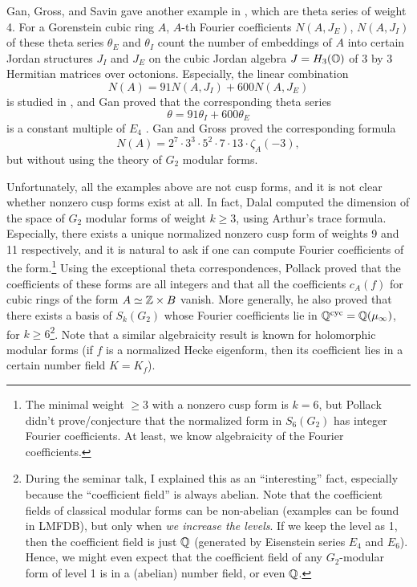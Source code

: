 Gan, Gross, and Savin gave another example in \cite{gan2002fourier}, which are theta series of weight 4.
For a Gorenstein cubic ring $A$, $A$-th Fourier coefficients $N(A, J_E)$, $N(A, J_I)$ of these theta series $\theta_E$ and $\theta_I$ count the number of embeddings  of $A$ into certain Jordan structures $J_I$ and $J_E$ on the cubic Jordan algebra $J = H_3(\mathbb{O})$ of 3 by 3 Hermitian matrices over octonions.
Especially, the linear combination
$$
N(A) = 91 N(A, J_I) + 600 N(A, J_E)
$$
is studied in \cite{gross1999commutative}, and Gan proved that the corresponding theta series
$$
\theta = 91 \theta_I + 600 \theta_E
$$
is a constant multiple of $E_4$ \cite{gan2000siegel}.
Gan and Gross proved the corresponding formula \cite[Theorem 3]{gross1999commutative}
$$
N(A) = 2^7 \cdot 3^3 \cdot 5^2 \cdot 7 \cdot 13 \cdot \zeta_A(-3),
$$
but without using the theory of $G_2$ modular forms.

Unfortunately, all the examples above are not cusp forms, and it is not clear whether nonzero cusp forms exist at all.
In fact, Dalal \cite{dalal2023counting} computed the dimension of the space of $G_2$ modular forms of weight $k \ge 3$, using Arthur's trace formula.
Especially, there exists a unique normalized nonzero cusp form of weights 9 and 11 respectively, and it is natural to ask if one can compute Fourier coefficients of the form.\footnote{The minimal weight $\ge 3$ with a nonzero cusp form is $k = 6$, but Pollack didn't prove/conjecture that the normalized form in $S_6(G_2)$ has integer Fourier coefficients. At least, we know algebraicity of the Fourier coefficients.}
Using the exceptional theta correspondences, Pollack \cite{pollack2022exceptional,pollack2024computation} proved that the coefficients of these forms are all integers and that all the coefficients $c_A(f)$ for cubic rings of the form $A \simeq \mathbb{Z} \times B$ vanish.
More generally, he also proved that there exists a basis of $S_k(G_2)$ whose Fourier coefficients lie in $\mathbb{Q}^{\mathrm{cyc}} = \mathbb{Q}(\mu_\infty)$, for $k \ge 6$\footnote{During the seminar talk, I explained this as an ``interesting'' fact, especially because the ``coefficient field'' is always abelian. Note that the coefficient fields of classical modular forms can be non-abelian (examples can be found in LMFDB), but only when \emph{we increase the levels}. If we keep the level as 1, then the coefficient field is just $\mathbb{Q}$ (generated by Eisenstein series $E_4$ and $E_6$). Hence, we might even expect that the coefficient field of any $G_2$-modular form of level 1 is in a (abelian) number field, or even $\mathbb{Q}$.}.
Note that a similar algebraicity result is known for holomorphic modular forms (if $f$ is a normalized Hecke eigenform, then its coefficient lies in a certain number field $K = K_f$).
